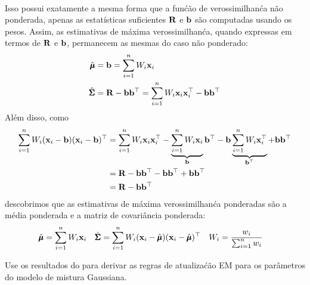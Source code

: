 \begin{exenumerate}
\begin{solution}
\begin{align}
        \end{align}
        Isso possui exatamente a mesma forma que a fun\'c\~ao de verossimilhan\'ca n\~ao ponderada, apenas as
        estat\'isticas suficientes $\mathbf{R}$ e $\mathbf{b}$ s\~ao computadas usando os pesos. Assim,
        as estimativas de m\'axima verossimilhan\'ca, quando expressas em termos de $\mathbf{R}$ e $\mathbf{b}$,
        permanecem as mesmas do caso n\~ao ponderado:
        \begin{align}
            \hat{\pmb{\mu}} & = \mathbf{b}  =  \sum_{i=1}^n W_i\mathbf{x}_i\\
            \hat{\pmb{\Sigma}} & = \mathbf{R} - \mathbf{b}\mathbf{b}^\top=  \sum_{i=1}^n W_i \mathbf{x}_i \mathbf{x}_i^\top - \mathbf{b}\mathbf{b}^\top
        \end{align}
        Al\'em disso, como
        \begin{align}
            \sum_{i=1}^n W_i (\mathbf{x}_i-\mathbf{b})(\mathbf{x}_i-\mathbf{b})^\top  & =  \sum_{i=1}^n W_i \mathbf{x}_i \mathbf{x}_i^\top - \underbrace{\sum_{i=1}^n W_i \mathbf{x}_i}_{\mathbf{b}} \mathbf{b}^\top - \mathbf{b} \underbrace{\sum_{i=1}^n W_i \mathbf{x}_i^\top}_{\mathbf{b}^\top} + \mathbf{b}\mathbf{b}^\top\\
            &=\mathbf{R} - \mathbf{b} \mathbf{b}^\top - \mathbf{b} \mathbf{b}^\top + \mathbf{b}\mathbf{b}^\top\\
            & =  \mathbf{R} - \mathbf{b}\mathbf{b}^\top
        \end{align}
        descobrimos que as estimativas de m\'axima verossimilhan\'ca ponderadas s\~ao a m\'edia ponderada
        e a matriz de covari\^ancia ponderada:
        \begin{align}
            \hat{\pmb{\mu}} & =   \sum_{i=1}^n W_i\mathbf{x}_i&  \hat{\pmb{\Sigma}} &=    \sum_{i=1}^n W_i (\mathbf{x}_i-\hat{\pmb{\mu}})(\mathbf{x}_i-\hat{\pmb{\mu}})^\top & W_i&= \frac{w_i}{\sum_{i=1}^n w_i}
        \end{align}
    \end{solution}
    
    \item Use os resultados do  para derivar as regras de atualiza\'c\~ao EM para os par\^ametros do modelo de mistura Gaussiana.
    

\end{exenumerate}

